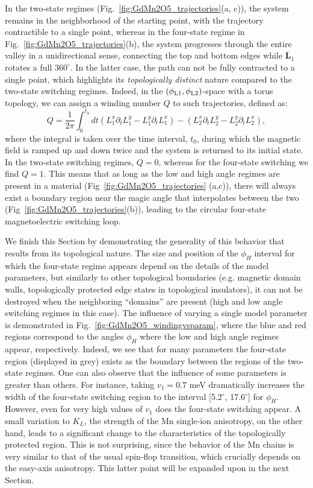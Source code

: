 In the two-state regimes (Fig.~\ref{fig:GdMn2O5_trajectories}(a, c)), the system remains in the neighborhood of the starting point, with the trajectory contractible to a single point, whereas in the four-state regime in Fig.~\ref{fig:GdMn2O5_trajectories}(b), the system progresses through the entire valley in a unidirectional sense, connecting the top and bottom edges while $\bm{L}_1$ rotates a full $360^\circ$.
In the latter case, the path can not be fully contracted to a single point, which highlights its {\em  topologically distinct} nature compared to the two-state switching regimes.
Indeed, in the $(\phi_{\rm L1},\phi_{\rm L2})$-space with a torus topology, we can assign a winding number $Q$ to such trajectories, defined as:
\begin{equation}
Q=\frac{1}{2\pi}\int_0^{t_0} dt (L_1^x\partial_t L_1^y - L_1^y \partial_t L_1^x) - (L_2^x\partial_t L_2^y - L_2^y \partial_t L_2^x),
\end{equation}
where the integral is taken over the time interval, $t_0$, during which the magnetic field is ramped up and down twice and the system is returned to its initial state.
In the two-state switching regimes, $Q  = 0$, whereas for the four-state switching we find $Q = 1$.
This means that as long as the low and high angle regimes are present in a material (Fig~\ref{fig:GdMn2O5_trajectories} (a,c)), there will always exist a boundary region near the magic angle that interpolates between the two (Fig~\ref{fig:GdMn2O5_trajectories}(b)), leading to the circular four-state magnetoelectric switching loop.

We finish this Section by demonstrating the generality of this behavior that results from its topological nature.
The size and position of the $\phi_H$ interval for which the four-state regime appears depend on the details of the model parameters, but similarly to other topological boundaries (e.g. magnetic domain walls, topologically protected edge states in topological insulators), it can not be destroyed when the neighboring ``domains'' are present (high and low angle switching regimes in this case).
The influence of varying a single model parameter is demonstrated in Fig.~\ref{fig:GdMn2O5_windingvsparam}, where the blue and red regions correspond to the angles $\phi_H$ where the low and high angle regimes appear, respectively.
Indeed, we see that for many parameters the four-state region (displayed in grey) exists as the boundary between the regions of the two-state regimes.
One can also observe that the influence of some parameters is greater than others. For instance, taking $v_1=0.7$ meV dramatically increases the width of the four-state switching region to the interval [5.2$^\circ$, 17.6$^\circ$] for $\phi_H$.
However, even for very high values of $v_1$ does the four-state switching appear.
A small variation to $K_L$, the strength of the Mn single-ion anisotropy, on the other hand, leads to a significant change to the characteristics of the topologically protected region.
This is not surprising, since the behavior of the Mn chains is very similar to that of the usual spin-flop transition, which crucially depends on the easy-axis anisotropy. This latter point will be expanded upon in the next Section.

